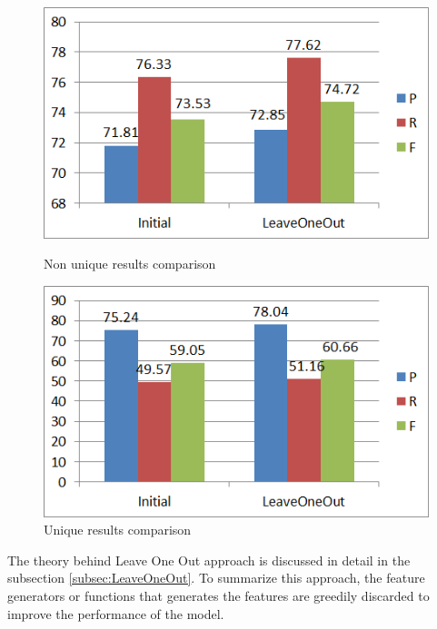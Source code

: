 \begin{figure}
\centering
\begin{minipage}{.5\textwidth}
  \centering
  \includegraphics[width=.95\textwidth]{figures/LeaveOneOutNUniq.png}
  \caption{Non unique results comparison}
  \label{fig:LeaveOO_NU}
\end{minipage}%
\begin{minipage}{.5\textwidth}
  \centering
  \includegraphics[width=.95\textwidth]{figures/LeaveOneOutUniq.png}
  \caption{Unique results comparison}
  \label{fig:LeaveOO_U}
\end{minipage}
\end{figure}

The theory behind Leave One Out approach is discussed in detail in the subsection \ref{subsec:LeaveOneOut}. To summarize this approach, the feature generators or functions that generates the features are greedily discarded to improve the performance of the model.

